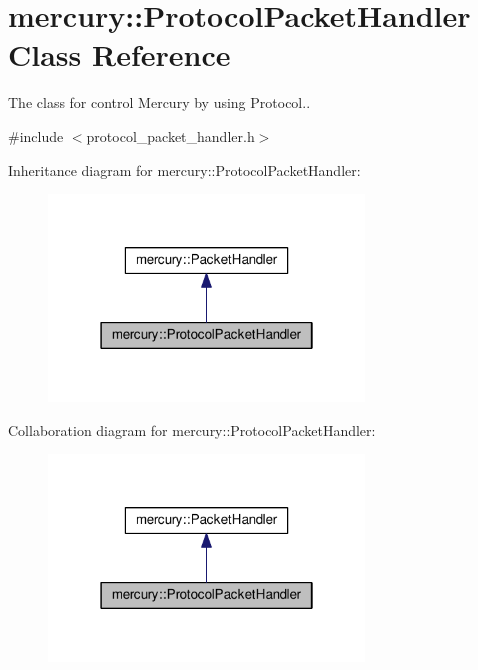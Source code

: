 \hypertarget{classmercury_1_1_protocol_packet_handler}{}\section{mercury\+:\+:Protocol\+Packet\+Handler Class Reference}
\label{classmercury_1_1_protocol_packet_handler}


The class for control Mercury by using Protocol..  




{\ttfamily \#include $<$protocol\+\_\+packet\+\_\+handler.\+h$>$}



Inheritance diagram for mercury\+:\+:Protocol\+Packet\+Handler\+:\nopagebreak
\begin{figure}[H]
\begin{center}
\leavevmode
\includegraphics[width=238pt]{classmercury_1_1_protocol_packet_handler__inherit__graph}
\end{center}
\end{figure}


Collaboration diagram for mercury\+:\+:Protocol\+Packet\+Handler\+:\nopagebreak
\begin{figure}[H]
\begin{center}
\leavevmode
\includegraphics[width=238pt]{classmercury_1_1_protocol_packet_handler__coll__graph}
\end{center}
\end{figure}
